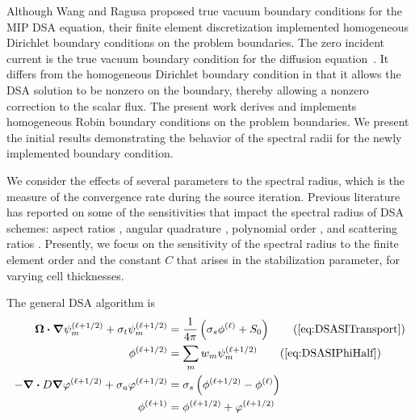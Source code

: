 \documentclass[12pt]{article}
\begin{document}
Although Wang and Ragusa proposed true vacuum boundary conditions for the MIP DSA equation, their finite element discretization implemented homogeneous Dirichlet boundary conditions on the problem boundaries. The zero incident current is the true vacuum boundary condition for the diffusion equation~\cite{AdamsDSADFEM}. It differs from the homogeneous Dirichlet boundary condition in that it allows the DSA solution to be nonzero on the boundary, thereby allowing a nonzero correction to the scalar flux. The present work derives and implements homogeneous Robin boundary conditions on the problem boundaries. We present the initial results demonstrating the behavior of the spectral radii for the newly implemented boundary condition.

We consider the effects of several parameters to the spectral radius, which is the measure of the convergence rate during the source iteration. Previous literature has reported on some of the sensitivities that impact the spectral radius of DSA schemes: aspect ratios \cite{AdamsDSADFEM,TurcksinDiscontinuousDSA}, angular quadrature \cite{AdamsDSADFEM,TurcksinDiscontinuousDSA}, polynomial order \cite{WoodsDSA,WangRagusaDSA}, and scattering ratios \cite{WoodsDSA,WangRagusaDSA,WareingDSADFEM}. Presently, we focus on the sensitivity of the spectral radius to the finite element order and the constant $C$ that arises in the stabilization parameter, for varying cell thicknesses.

The general DSA algorithm is
\begin{subequations}
\begin{flalign}
\vec{\Omega} \vd \grad \psi_m^{(\ell+1/2)} + \sigma_t \psi_m^{(\ell+1/2)} & = \frac{1}{4 \pi} \left(\sigma_s \phi^{(\ell)} + S_0 \right) \tag{\ref{eq:DSASITransport}} \\
\phi^{(\ell+1/2)} & = \sum_m w_m \psi_m^{(\ell+1/2)} \tag{\ref{eq:DSASIPhiHalf}} \\
-\grad \vd D \grad \varphi^{(\ell+1/2)} + \sigma_a \varphi^{(\ell+1/2)} & = \sigma_s \left(\phi^{(\ell+1/2)} - \phi^{(\ell)} \right) \label{eq:DSASIEquation} \\
\phi^{(\ell+1)} & = \phi^{(\ell+1/2)} + \varphi^{(\ell+1/2)} \label{eq:DSASIPhiEnd}
\end{flalign}
\label{eqs:DSAAlgorithm}
\end{subequations}
\end{document}
